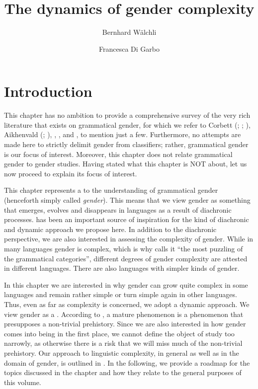 \documentclass[output=collectionpaper]{langsci/langscibook}
\title{The dynamics of gender complexity}
\author{%
Bernhard Wälchli%
\and%
Francesca Di Garbo%
}%
\begin{document}
\section{Introduction}
\label{sec:WDG:1}

This chapter has no ambition to provide a comprehensive survey of the very rich literature that exists on grammatical gender, for which we refer to Corbett (\citealt*{Corbett1991}; \citealt*{Corbett2006}; \citealt*{Corbett2014}), Aikhenvald (\citealt*{Aikhenvald2000}; \citealt*{Aikhenvald2016}), \cite{Kilarski2013}, \cite{Heine1982}, and \cite{Seifart2010}, to mention just a few. Furthermore, no attempts are made here to strictly delimit gender from classifiers; rather, grammatical gender is our focus of interest. Moreover, this chapter does not relate grammatical gender to gender studies. Having stated what this chapter is NOT about, let us now proceed to explain its focus of interest.

This chapter represents a  to the understanding of grammatical gender (henceforth simply called \textit{gender}). This means that we view gender as something that emerges, evolves and disappears in languages as a result of diachronic processes. \cite{Greenberg1978} has been an important source of inspiration for the kind of diachronic and dynamic approach we propose here. In addition to the diachronic perspective, we are also interested in assessing the complexity of gender. While in many languages gender is complex, which is why \cite[1]{Corbett1991} calls it ``the most puzzling of the grammatical categories'', different degrees of gender complexity are attested in different languages. There are also languages with simpler kinds of gender.

In this chapter we are interested in why gender can grow quite complex in some languages and remain rather simple or turn simple again in other languages. Thus, even as far as complexity is concerned, we adopt a dynamic approach. We view gender as a . According to \cite[2]{Dahl2004}, a mature phenomenon is a phenomenon that presupposes a non-trivial prehistory. Since we are also interested in how gender comes into being in the first place, we cannot define the object of study too narrowly, as otherwise there is a risk that we will miss much of the non-trivial prehistory. Our approach to linguistic complexity, in general as well as in the domain of gender, is outlined in . In the following, we provide a roadmap for the topics discussed in the chapter and how they relate to the general purposes of this volume.
\end{document}
